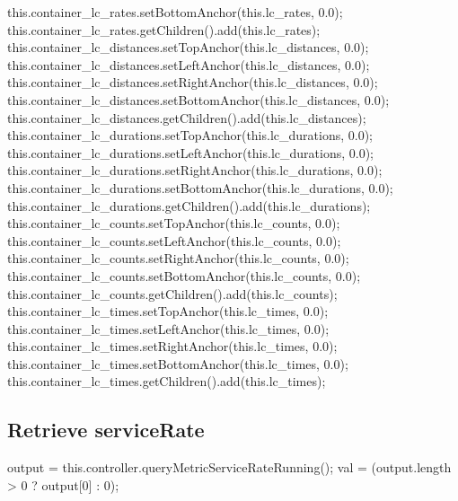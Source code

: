 this.container_lc_rates.setBottomAnchor(this.lc_rates, 0.0);
this.container_lc_rates.getChildren().add(this.lc_rates);
this.container_lc_distances.setTopAnchor(this.lc_distances, 0.0);
this.container_lc_distances.setLeftAnchor(this.lc_distances, 0.0);
this.container_lc_distances.setRightAnchor(this.lc_distances, 0.0);
this.container_lc_distances.setBottomAnchor(this.lc_distances, 0.0);
this.container_lc_distances.getChildren().add(this.lc_distances);
this.container_lc_durations.setTopAnchor(this.lc_durations, 0.0);
this.container_lc_durations.setLeftAnchor(this.lc_durations, 0.0);
this.container_lc_durations.setRightAnchor(this.lc_durations, 0.0);
this.container_lc_durations.setBottomAnchor(this.lc_durations, 0.0);
this.container_lc_durations.getChildren().add(this.lc_durations);
this.container_lc_counts.setTopAnchor(this.lc_counts, 0.0);
this.container_lc_counts.setLeftAnchor(this.lc_counts, 0.0);
this.container_lc_counts.setRightAnchor(this.lc_counts, 0.0);
this.container_lc_counts.setBottomAnchor(this.lc_counts, 0.0);
this.container_lc_counts.getChildren().add(this.lc_counts);
this.container_lc_times.setTopAnchor(this.lc_times, 0.0);
this.container_lc_times.setLeftAnchor(this.lc_times, 0.0);
this.container_lc_times.setRightAnchor(this.lc_times, 0.0);
this.container_lc_times.setBottomAnchor(this.lc_times, 0.0);
this.container_lc_times.getChildren().add(this.lc_times);
\nwendcode{}\nwdocspar

\subsection{Retrieve serviceRate}
\nwenddocs{}\endmoddef{}
output = this.controller.queryMetricServiceRateRunning();
val = (output.length > 0 ? output[0] : 0);
\nwendcode{}\nwdocspar

